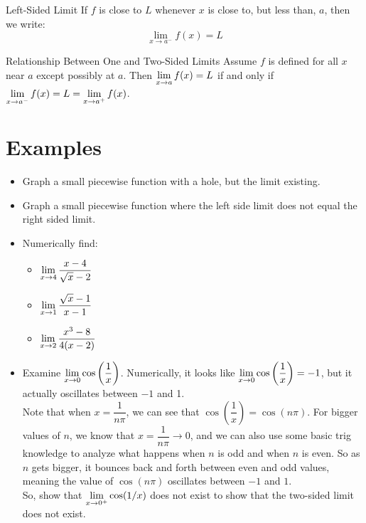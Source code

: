 \begin{defn}{Left-Sided Limit}
If $f$ is close to $L$ whenever $x$ is close to, but less than, $a$, then we write:
\[ \lim_{x\to a^-} f(x)=L\]
\end{defn}

\begin{thm}{Relationship Between One and Two-Sided Limits}
Assume $f$ is defined for all $x$ near $a$ except possibly at $a$. Then $\displaystyle \lim_{x\to a} f(x) = L$ if and only if $\displaystyle \lim_{x\to a^-}f(x) = L = \displaystyle \lim_{x\to a^+} f(x)$.
\end{thm}

\section*{Examples}

\begin{itemize}
\item Graph a small piecewise function with a hole, but the limit existing.
\item Graph a small piecewise function where the left side limit does not equal the right sided limit.
\item Numerically find:
\begin{multicols}{3}
\begin{itemize}
  \item $\displaystyle \lim_{x\to 4} \dfrac{x-4}{\sqrt{x}-2}$
  \item $\displaystyle \lim_{x\to 1} \dfrac{\sqrt{x}-1}{x-1}$
  \item $\displaystyle \lim_{x\to 2} \dfrac{x^3-8}{4(x-2)}$
\end{itemize}
\end{multicols}
\item Examine $\displaystyle \lim_{x\to 0} \cos\left(\dfrac{1}{x}\right)$. Numerically, it looks like $\displaystyle \lim_{x\to 0} \cos\left(\dfrac{1}{x}\right)=-1$, but it actually oscillates between $-1$ and 1.\\
Note that when $x=\dfrac{1}{n\pi}$, we can see that  $\cos\left(\dfrac{1}{x}\right)=\cos(n\pi)$. For bigger values of $n$, we know that $x=\dfrac{1}{n\pi} \to 0$, and we can also use some basic trig knowledge to analyze what happens when $n$ is odd and when $n$ is even. So as $n$ gets bigger, it bounces back and forth between even and odd values, meaning the value of $\cos(n\pi)$ oscillates between $-1$ and $1$.\\

So, show that $\displaystyle \lim_{x\to0^+}\cos(1/x)$ does not exist to show that the two-sided limit does not exist.
\end{itemize}

